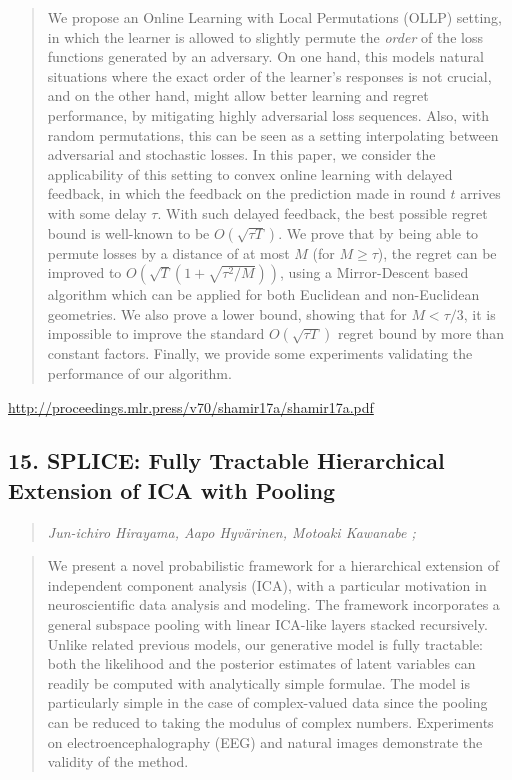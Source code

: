 \documentclass{article}
\begin{document}
\begin{quote}
    We propose an Online Learning with Local Permutations (OLLP) setting, in which the learner is allowed to slightly permute the \textit{order} of the loss functions generated by an adversary. On one hand, this models natural situations where the exact order of the learner’s responses is not crucial, and on the other hand, might allow better learning and regret performance, by mitigating highly adversarial loss sequences. Also, with random permutations, this can be seen as a setting interpolating between adversarial and stochastic losses. In this paper, we consider the applicability of this setting to convex online learning with delayed feedback, in which the feedback on the prediction made in round $t$ arrives with some delay $\tau$. With such delayed feedback, the best possible regret bound is well-known to be $O(\sqrt{\tau T})$. We prove that by being able to permute losses by a distance of at most $M$ (for $M\geq \tau$), the regret can be improved to $O(\sqrt{T}(1+\sqrt{\tau^2/M}))$, using a Mirror-Descent based algorithm which can be applied for both Euclidean and non-Euclidean geometries. We also prove a lower bound, showing that for $M<\tau/3$, it is impossible to improve the standard $O(\sqrt{\tau T})$ regret bound by more than constant factors. Finally, we provide some experiments validating the performance of our algorithm.  
\end{quote}

\href{http://proceedings.mlr.press/v70/shamir17a/shamir17a.pdf}{http://proceedings.mlr.press/v70/shamir17a/shamir17a.pdf}

\subsection{15. SPLICE: Fully Tractable Hierarchical Extension of ICA with Pooling}

\begin{quote}
\footnotesize{\textit{Jun-ichiro Hirayama, Aapo Hyvärinen, Motoaki Kawanabe ;}}

\end{quote}

\begin{quote}
    We present a novel probabilistic framework for a hierarchical extension of independent component analysis (ICA), with a particular motivation in neuroscientific data analysis and modeling. The framework incorporates a general subspace pooling with linear ICA-like layers stacked recursively. Unlike related previous models, our generative model is fully tractable: both the likelihood and the posterior estimates of latent variables can readily be computed with analytically simple formulae. The model is particularly simple in the case of complex-valued data since the pooling can be reduced to taking the modulus of complex numbers. Experiments on electroencephalography (EEG) and natural images demonstrate the validity of the method.  
\end{quote}
\end{document}
